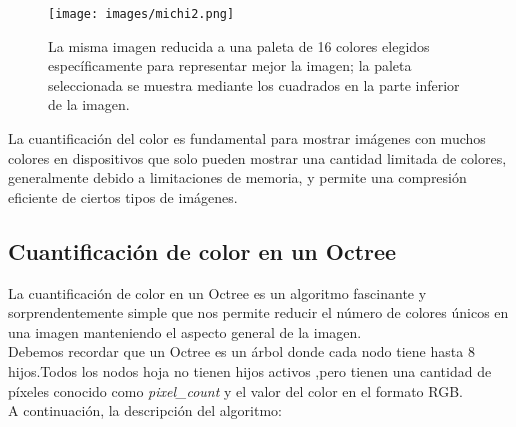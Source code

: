 \begin{figure}[H]
  \centering
  \texttt{[image: images/michi2.png]}
  \caption{La misma imagen reducida a una paleta de 16 colores elegidos específicamente para representar mejor la imagen; la paleta seleccionada se muestra mediante los cuadrados en la parte inferior de la imagen.}
  \label{fig:act-4}
\end{figure}

La cuantificación del color es fundamental para mostrar imágenes con muchos colores en dispositivos que solo pueden mostrar una cantidad limitada de colores, generalmente debido a limitaciones de memoria, y permite una compresión eficiente de ciertos tipos de imágenes.

\subsection{Cuantificación de color en un Octree}
La cuantificación de color en un Octree es un algoritmo fascinante y sorprendentemente simple que nos permite reducir el número de colores únicos en una imagen manteniendo el aspecto general de la imagen. \\
Debemos recordar que un Octree es un árbol donde cada nodo tiene hasta 8 hijos.Todos los nodos hoja no tienen hijos activos ,pero tienen una cantidad de píxeles conocido como \textit{pixel\_count} y el valor del color en el formato RGB.\\
A continuación, la descripción del algoritmo:

